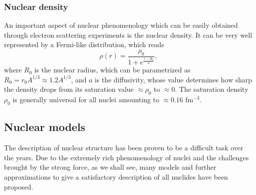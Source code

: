 \subsubsection{Nuclear density}
An important aspect of nuclear phenomenology which can be easily obtained through electron scattering experiments \cite{Hofstadter1956} is the nuclear density. It can be very well represented by a Fermi-like distribution, which reads
\begin{equation}
    \label{eq:phen_density}
    \rho(r)=\frac{\rho_0}{1+e^{\frac{r-R_0}{a}}},
\end{equation}
where $R_0$ is the nuclear radius, which can be parametrized as $R_0=r_0 A^{1/3}\approx 1.2A^{1/3}$, and $a$ is the diffusivity, whose value determines how sharp the density drops from its saturation value $\approx \rho_0$ to $\approx 0$. The saturation density $\rho_0$ is generally universal for all nuclei amounting to $\approx 0.16$ fm$^{-3}$.
\subsection{Nuclear models}
The description of nuclear structure has been proven to be a difficult task over the years. Due to the extremely rich phenomenology of nuclei and the challenges brought by the strong force, as we shall see, many models and further approximations to give a satisfactory description of all nuclides have been proposed.

